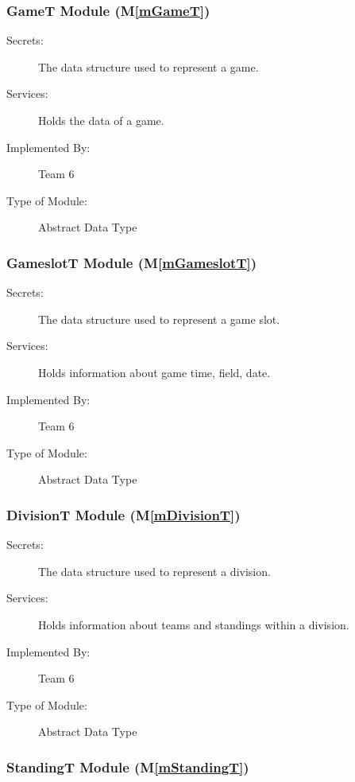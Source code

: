 \documentclass[12pt, titlepage]{article}
\newcommand{\mref}[1]{M\ref{#1}}
\begin{document}
  \subsubsection{GameT Module (\mref{mGameT})}

  \begin{description}
    \item[Secrets:] The data structure used to represent a game.
    \item[Services:] Holds the data of a game.
    \item[Implemented By:] Team 6
    \item[Type of Module:] Abstract Data Type
  \end{description}

  \subsubsection{GameslotT Module (\mref{mGameslotT})}

\begin{description}
  \item[Secrets:] The data structure used to represent a game slot.
  \item[Services:] Holds information about game time, field, date.
  \item[Implemented By:] Team 6
  \item[Type of Module:] Abstract Data Type
\end{description}

\subsubsection{DivisionT Module (\mref{mDivisionT})}

\begin{description}
  \item[Secrets:] The data structure used to represent a division.
  \item[Services:] Holds information about teams and standings within a division.
  \item[Implemented By:] Team 6
  \item[Type of Module:] Abstract Data Type
\end{description}

\subsubsection{StandingT Module (\mref{mStandingT})}
\end{document}
